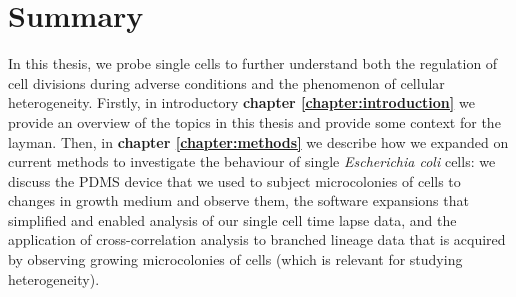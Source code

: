 

\chapter*{Summary}

In this thesis, we probe single cells to 
further understand both
the regulation of cell divisions during adverse conditions
and the phenomenon of cellular heterogeneity.
%
Firstly, in introductory \textbf{chapter \ref{chapter:introduction}} we 
provide an overview of the topics in this thesis and provide some context for the layman.
%
Then, in \textbf{chapter \ref{chapter:methods}} we describe how we expanded on current methods to investigate the behaviour of single \textit{Escherichia coli} cells: 
%
we discuss the PDMS device that we used to subject microcolonies of cells to changes in growth medium and observe them,
the software expansions that simplified and enabled analysis of our single cell time lapse data, and 
the application of cross-correlation analysis to branched lineage data that is acquired by observing growing microcolonies of cells (which is relevant for studying heterogeneity).

